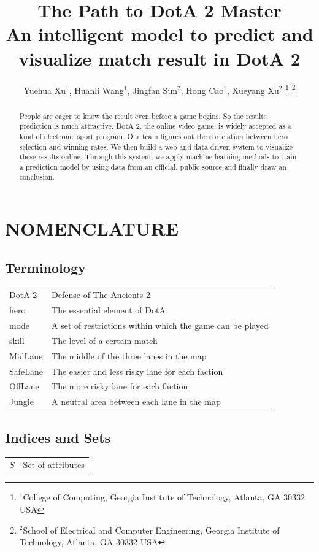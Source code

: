 \documentclass[letterpaper, 10 pt, conference]{ieeeconf}  %
\title{\LARGE \bf
The Path to DotA 2 Master\\
\large \bf An intelligent model to predict and visualize match result in DotA 2
}
\author{Yuehua Xu$^{1}$, Huanli Wang$^{1}$, Jingfan Sun$^{2}$, Hong Cao$^{1}$, Xueyang Xu$^{2}$%
\thanks{$^{1}$College of Computing, Georgia Institute of Technology, Atlanta, GA 30332 USA}%
\thanks{$^{2}$School of Electrical and Computer Engineering, Georgia Institute of Technology, Atlanta, GA 30332 USA}%
}
\begin{document}
\maketitle
\thispagestyle{empty}
\pagestyle{empty}

\begin{abstract}

People are eager to know the result even before a game begins. So the results prediction is much attractive. DotA 2, the online video game, is widely accepted as a kind of electronic sport program. Our team figures out the correlation between hero selection and winning rates. We then build a web and data-driven system to visualize these results online. Through this system, we apply machine learning methods to train a prediction model by using data from an official, public source and finally draw an conclusion.

\end{abstract}
\section*{NOMENCLATURE}
\subsection*{Terminology}
\begin{supertabular}{p{1.5cm} p{6.4cm}}
DotA 2 & Defense of The Ancients 2\\
hero & The essential element of DotA\\
mode & A set of restrictions within which the game can be played\\
skill & The level of a certain match\\
MidLane & The middle of the three lanes in the map\\
SafeLane & The easier and less risky lane for each faction\\
OffLane & The more risky lane for each faction\\
Jungle & A neutral area between each lane in the map\\
\end{supertabular}
\subsection*{Indices and Sets}
\begin{supertabular}{p{1.5cm} p{6.4cm}}
$S$ & Set of attributes\\
\end{supertabular}
\end{document}
